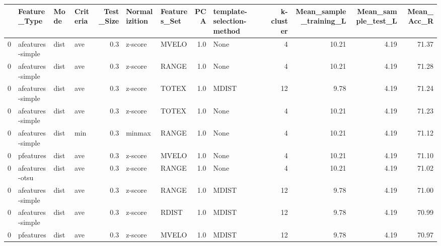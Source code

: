 \begin{tabular}{llllrllrlrrrr}
\toprule
{} &      Feature\_Type &  Mode & Criteria &  Test\_Size & Normalizition & Features\_Set &  PCA & template-selection-method &  k-cluster &  Mean\_sample\_training\_L &  Mean\_sample\_test\_L &  Mean\_Acc\_R \\
\midrule
0 &  afeatures-simple &  dist &      ave &        0.3 &       z-score &        MVELO &  1.0 &                      None &          4 &                   10.21 &                4.19 &       71.37 \\
0 &  afeatures-simple &  dist &      ave &        0.3 &       z-score &        RANGE &  1.0 &                      None &          4 &                   10.21 &                4.19 &       71.28 \\
0 &  afeatures-simple &  dist &      ave &        0.3 &       z-score &        TOTEX &  1.0 &                     MDIST &         12 &                    9.78 &                4.19 &       71.24 \\
0 &  afeatures-simple &  dist &      ave &        0.3 &       z-score &        TOTEX &  1.0 &                      None &          4 &                   10.21 &                4.19 &       71.23 \\
0 &  afeatures-simple &  dist &      min &        0.3 &        minmax &        RANGE &  1.0 &                      None &          4 &                   10.21 &                4.19 &       71.12 \\
0 &         pfeatures &  dist &      ave &        0.3 &       z-score &        MVELO &  1.0 &                      None &          4 &                   10.21 &                4.19 &       71.10 \\
0 &    afeatures-otsu &  dist &      ave &        0.3 &       z-score &        RANGE &  1.0 &                      None &          4 &                   10.21 &                4.19 &       71.02 \\
0 &  afeatures-simple &  dist &      ave &        0.3 &       z-score &        RANGE &  1.0 &                     MDIST &         12 &                    9.78 &                4.19 &       71.00 \\
0 &  afeatures-simple &  dist &      ave &        0.3 &       z-score &        RDIST &  1.0 &                     MDIST &         12 &                    9.78 &                4.19 &       70.99 \\
0 &         pfeatures &  dist &      ave &        0.3 &       z-score &        MVELO &  1.0 &                     MDIST &         12 &                    9.78 &                4.19 &       70.97 \\
\bottomrule
\end{tabular}
